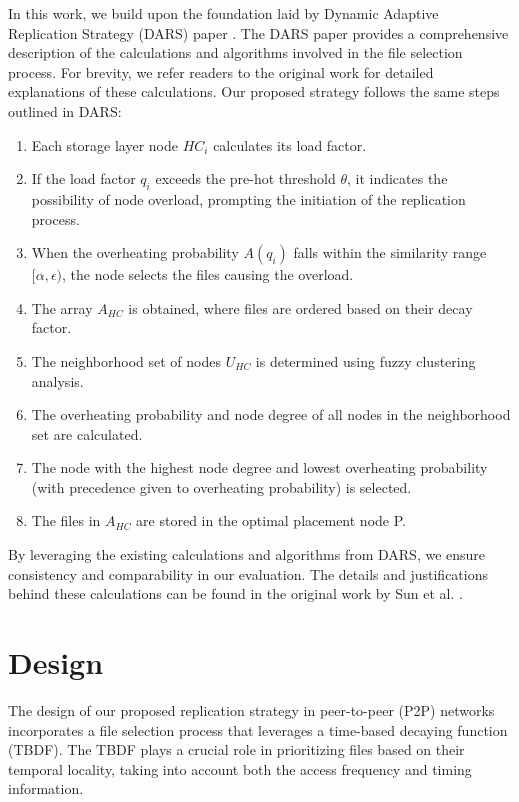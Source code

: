 \documentclass[10pt, conference]{IEEEtran}
\begin{document}
In this work, we build upon the foundation laid by Dynamic Adaptive Replication Strategy (DARS) paper \cite{sun_2018_dars}. The DARS paper provides a comprehensive description of the calculations and algorithms involved in the file selection process. For brevity, we refer readers to the original work for detailed explanations of these calculations. Our proposed strategy follows the same steps outlined in DARS:

\begin{enumerate}
\item Each storage layer node $HC_i$ calculates its load factor.
\item If the load factor $q_i$ exceeds the pre-hot threshold $\theta$, it indicates the possibility of node overload, prompting the initiation of the replication process.
\item When the overheating probability $A(q_i)$ falls within the similarity range $[\alpha, \epsilon)$, the node selects the files causing the overload.
\item The array $A_{HC}$ is obtained, where files are ordered based on their decay factor.
\item The neighborhood set of nodes $U_{HC}$ is determined using fuzzy clustering analysis.
\item The overheating probability and node degree of all nodes in the neighborhood set are calculated.
\item The node with the highest node degree and lowest overheating probability (with precedence given to overheating probability) is selected.
\item The files in $A_{HC}$ are stored in the optimal placement node P.
\end{enumerate}

By leveraging the existing calculations and algorithms from DARS, we ensure consistency and comparability in our evaluation. The details and justifications behind these calculations can be found in the original work by Sun et al. \cite{sun_2018_dars}.

\section{Design}\label{sec:design}

The design of our proposed replication strategy in peer-to-peer (P2P) networks incorporates a file selection process that leverages a time-based decaying function (TBDF). The TBDF plays a crucial role in prioritizing files based on their temporal locality, taking into account both the access frequency and timing information.
\end{document}
